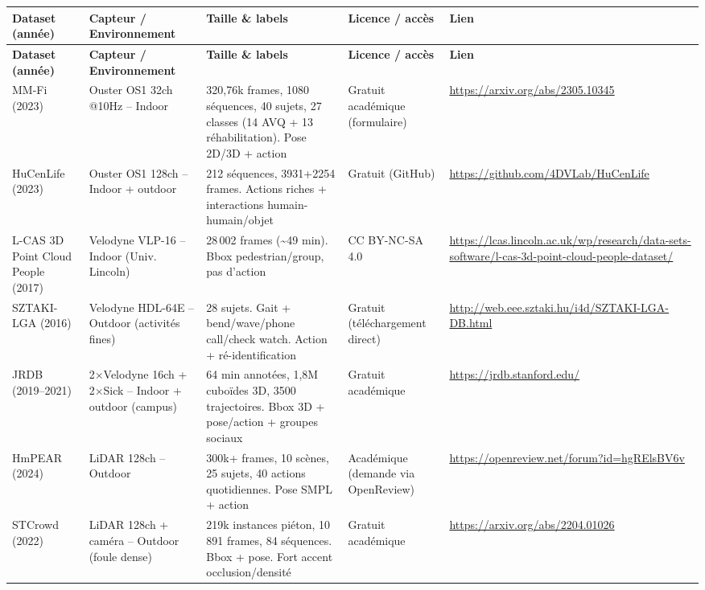 \documentclass[11pt]{article}
\begin{document}
\begin{longtable}{P{2.6cm} P{3.0cm} P{4.2cm} P{2.4cm} P{3.0cm}}
\toprule
\textbf{Dataset (année)} & \textbf{Capteur / Environnement} & \textbf{Taille \& labels} & \textbf{Licence / accès} & \textbf{Lien} \\
\midrule
\endfirsthead
\toprule
\textbf{Dataset (année)} & \textbf{Capteur / Environnement} & \textbf{Taille \& labels} & \textbf{Licence / accès} & \textbf{Lien} \\
\midrule
\endhead

MM-Fi (2023) &
Ouster OS1 32ch @10Hz -- Indoor &
320,76k frames, 1080 séquences, 40 sujets, 27 classes (14 AVQ + 13 réhabilitation). Pose 2D/3D + action &
Gratuit académique (formulaire) &
\url{https://arxiv.org/abs/2305.10345} \\
\addlinespace

HuCenLife (2023) &
Ouster OS1 128ch -- Indoor + outdoor &
212 séquences, 3931+2254 frames. Actions riches + interactions humain-humain/objet &
Gratuit (GitHub) &
\url{https://github.com/4DVLab/HuCenLife} \\
\addlinespace

L-CAS 3D Point Cloud People (2017) &
Velodyne VLP-16 -- Indoor (Univ. Lincoln) &
28\,002 frames (\textasciitilde{}49 min). Bbox pedestrian/group, pas d'action &
CC BY-NC-SA 4.0 &
\url{https://lcas.lincoln.ac.uk/wp/research/data-sets-software/l-cas-3d-point-cloud-people-dataset/} \\
\addlinespace

SZTAKI-LGA (2016) &
Velodyne HDL-64E -- Outdoor (activités fines) &
28 sujets. Gait + bend/wave/phone call/check watch. Action + ré-identification &
Gratuit (téléchargement direct) &
\url{http://web.eee.sztaki.hu/i4d/SZTAKI-LGA-DB.html} \\
\addlinespace

JRDB (2019--2021) &
2$\times$Velodyne 16ch + 2$\times$Sick -- Indoor + outdoor (campus) &
64 min annotées, 1,8M cuboïdes 3D, 3500 trajectoires. Bbox 3D + pose/action + groupes sociaux &
Gratuit académique &
\url{https://jrdb.stanford.edu/} \\
\addlinespace

HmPEAR (2024) &
LiDAR 128ch -- Outdoor &
300k+ frames, 10 scènes, 25 sujets, 40 actions quotidiennes. Pose SMPL + action &
Académique (demande via OpenReview) &
\url{https://openreview.net/forum?id=hgRElsBV6v} \\
\addlinespace

STCrowd (2022) &
LiDAR 128ch + caméra -- Outdoor (foule dense) &
219k instances piéton, 10\,891 frames, 84 séquences. Bbox + pose. Fort accent occlusion/densité &
Gratuit académique &
\url{https://arxiv.org/abs/2204.01026} \\

\bottomrule
\end{longtable}
\end{document}
